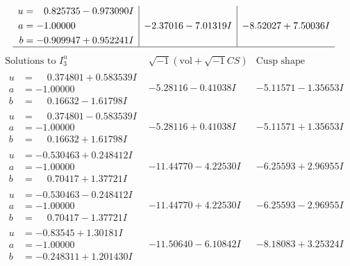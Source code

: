 \documentclass[1p]{elsarticle_modified}
\theoremstyle{definition}
\newcommand{\I}{\sqrt{-1}}
\begin{document}
$$\begin{array}{c|c|c}
\begin{aligned}
u &= \phantom{-}0.825735 - 0.973090 I \\
a &= -1.00000\phantom{ +0.000000I} \\
b &= -0.909947 + 0.952241 I\end{aligned}
 & -2.37016 - 7.01319 I & -8.52027 + 7.50036 I\\
 \hline 
 \end{array}$$\newpage$$\begin{array}{c|c|c}  
\text{Solutions to }I^u_{3}& \I (\text{vol} + \sqrt{-1}CS) & \text{Cusp shape}\\
 \hline 
\begin{aligned}
u &= \phantom{-}0.374801 + 0.583539 I \\
a &= -1.00000\phantom{ +0.000000I} \\
b &= \phantom{-}0.16632 - 1.61798 I\end{aligned}
 & -5.28116 - 0.41038 I & -5.11571 - 1.35653 I \\ \hline\begin{aligned}
u &= \phantom{-}0.374801 - 0.583539 I \\
a &= -1.00000\phantom{ +0.000000I} \\
b &= \phantom{-}0.16632 + 1.61798 I\end{aligned}
 & -5.28116 + 0.41038 I & -5.11571 + 1.35653 I \\ \hline\begin{aligned}
u &= -0.530463 + 0.248412 I \\
a &= -1.00000\phantom{ +0.000000I} \\
b &= \phantom{-}0.70417 + 1.37721 I\end{aligned}
 & -11.44770 - 4.22530 I & -6.25593 + 2.96955 I \\ \hline\begin{aligned}
u &= -0.530463 - 0.248412 I \\
a &= -1.00000\phantom{ +0.000000I} \\
b &= \phantom{-}0.70417 - 1.37721 I\end{aligned}
 & -11.44770 + 4.22530 I & -6.25593 - 2.96955 I \\ \hline\begin{aligned}
u &= -0.83545 + 1.30181 I \\
a &= -1.00000\phantom{ +0.000000I} \\
b &= -0.248311 + 1.201430 I\end{aligned}
 & -11.50640 - 6.10842 I & -8.18083 + 3.25324 I \\ \hline\begin{aligned}

\end{aligned}
\end{array}$$
\end{document}
